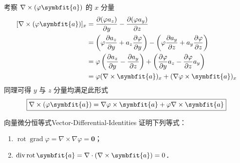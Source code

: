 \begin{myproof}

    考察 $\nabla \times (\varphi \symbfit{a})$ 的 $x$ 分量
    \begin{equation}
        \begin{aligned}
            \relax [\nabla \times (\varphi \symbfit{a})]_x & = \frac{\partial (\varphi a_z)}{\partial y} - \frac{\partial (\varphi a_y)}{\partial z}                                                                                                               \\
                                                           & = \left( \varphi \frac{\partial a_z}{\partial y} + a_z \frac{\partial \varphi}{\partial y} \right) - \left( \varphi \frac{\partial a_y}{\partial z} + a_y \frac{\partial \varphi}{\partial z} \right) \\
                                                           & = \varphi \left( \frac{\partial a_z}{\partial y} - \frac{\partial a_y}{\partial z} \right) + \left( \frac{\partial \varphi}{\partial y} a_z - \frac{\partial \varphi}{\partial z} a_y \right)         \\
                                                           & = \varphi (\nabla \times \symbfit{a})_x + (\nabla \varphi \times \symbfit{a})_x
        \end{aligned}
    \end{equation}
    同理可得 $y$ 与 $z$ 分量均满足此形式
    \begin{equation}
        \boxed{\nabla \times (\varphi \symbfit{a}) = \nabla \varphi \times \symbfit{a} + \varphi \nabla \times \symbfit{a}}
    \end{equation}
\end{myproof}


\begin{problem}{向量微分恒等式}{Vector-Differential-Identities}
    证明下列等式：
    \begin{enumerate}
        \item $\operatorname{rot} \operatorname{grad} \varphi = \nabla \times \nabla \varphi = \symbf{0}$；
        \item $\operatorname{div} \operatorname{rot} \symbfit{a} = \nabla \cdot (\nabla \times \symbfit{a}) = 0$．
    \end{enumerate}
\end{problem}

